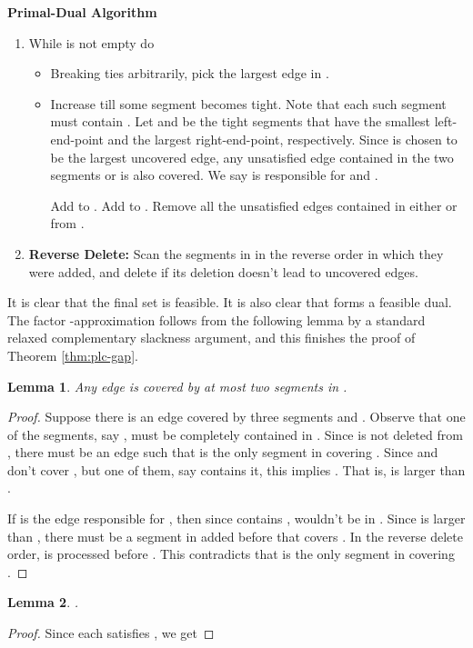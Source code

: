 \documentclass[11pt]{article}
\newtheorem{lemma}{Lemma}
\newcommand{\1}{\mathbb{1}}
\begin{document}
{\vspace{2mm}
\hspace{-6mm}
\begin{boxedminipage}{\textwidth}
{\bf Primal-Dual Algorithm} 
\begin{enumerate}
\item While  is not empty do
\begin{itemize}
	\item Breaking ties arbitrarily, pick the largest edge  in .
	\item Increase  till some segment becomes tight. Note
          that each such segment must contain . Let  and
           be the tight segments that have the smallest
          left-end-point and the largest right-end-point,
          respectively. Since  is chosen to be the largest
          uncovered edge, any unsatisfied edge contained in 
          the two segments 
          or  is also covered.  We say 
          is responsible for  and .
	
	Add  to . Add  to .
	Remove all the unsatisfied edges contained in either  or  from .
\end{itemize}

\item {\bf Reverse Delete:} Scan the segments  in  in the
  reverse order in which they were added, and delete  if its
  deletion doesn't lead to uncovered edges.
\end{enumerate}
\end{boxedminipage}

\vspace{4mm}
\noindent
It is clear that the final set  is feasible. It is also clear that
 forms a feasible dual.  The factor -approximation follows from
the following lemma by a standard relaxed complementary slackness
argument, and this finishes the proof of Theorem \ref{thm:plc-gap}.
\begin{lemma}\label{lem:atmost2}
  Any edge  is covered by at most two segments in .
\end{lemma}

\begin{proof}
  Suppose there is an edge  covered by three segments
   and .  Observe that one of the segments, say ,
  must be completely contained in .  Since  is not
  deleted from , there must be an edge  such that 
  is the only segment in  covering . Since  and  don't
  cover , but one of them, say  contains it, this implies
  . That is,  is larger than .

  If  is the edge responsible for , then since  contains
  ,  wouldn't be in . Since  is larger than , there
  must be a segment  in  added before  that covers . In
  the reverse delete order,  is processed before .  This
  contradicts that  is the only segment in  covering .
\end{proof}

\begin{lemma}
  .
\end{lemma}
\begin{proof}
  Since each  satisfies , we get
  
\end{proof}
}
\end{document}

